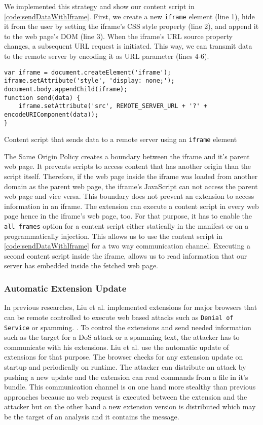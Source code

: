 	We implemented this strategy and show our content script in \autoref{code:sendDataWithIframe}. First, we create a new \texttt{iframe} element (line 1), hide it from the user by setting the iframe's CSS style property (line 2), and append it to the web page's DOM (line 3). When the iframe's URL source property changes, a subsequent URL request is initiated. This way, we can transmit data to the remote server by encoding it as URL parameter (lines 4-6).

\begin{code}
	\begin{lstlisting}
var iframe = document.createElement('iframe');
iframe.setAttribute('style', 'display: none;');
document.body.appendChild(iframe);
function send(data) {
	iframe.setAttribute('src', REMOTE_SERVER_URL + '?' + encodeURIComponent(data));
}
	\end{lstlisting}
	\caption{Content script that sends data to a remote server using an \texttt{iframe} element}
	\label{code:sendDataWithIframe}
\end{code}

	The Same Origin Policy creates a boundary between the iframe and it's parent web page. It prevents scripts to access content that has another origin than the script itself. Therefore, if the web page inside the iframe was loaded from another domain as the parent web page, the iframe's JavaScript can not access the parent web page and vice versa. This boundary does not prevent an extension to access information in an iframe. The extension can execute a content script in every web page hence in the iframe's web page, too. For that purpose, it has to enable the \texttt{all\_frames} option for a content script either statically in the manifest or on a programmatically injection. This allows us to use the content script in \autoref{code:sendDataWithIframe} for a two way communication channel. Executing a second content script inside the iframe, allows us to read information that our server has embedded inside the fetched web page.

\subsubsection{Automatic Extension Update}

	In previous researches, Liu et al. implemented extensions for major browsers that can be remote controlled to execute web based attacks such as \texttt{Denial of Service} or spamming. \cite{liu2011botnet, Liu12chromeextensions:}. To control the extensions and send needed information such as the target for a DoS attack or a spamming text, the attacker has to communicate with his extensions. Liu et al. use the automatic update of extensions for that purpose. The browser checks for any extension update on startup and periodically on runtime. The attacker can distribute an attack by pushing a new update and the extension can read commands from a file in it's bundle. This communication channel is on one hand more stealthy than previous approaches because no web request is executed between the extension and the attacker but on the other hand a new extension version is distributed which may be the target of an analysis and it contains the message. 


